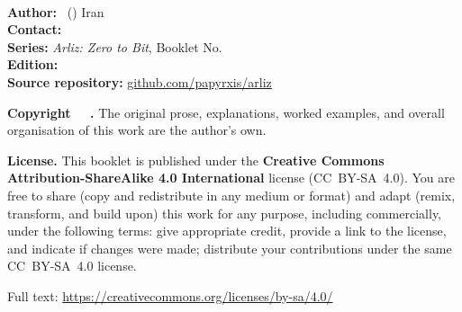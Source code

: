 \thispagestyle{empty}
\vspace*{0.8cm}
\begin{flushleft}
{\small\linespread{1.3}\selectfont

\textbf{\BookletTitle}\\[0.2em]
{\color{textsecondary}\BookletSubtitle}

\vspace{0.9em}

\textbf{Author:}   \BookletAuthor\ (\BookletAuthorHandle) \hfill Iran\\
\textbf{Contact:}  \href{mailto:\BookletEmail}{\BookletEmail}\\
\textbf{Series:}   \textit{Arliz: Zero to Bit},
                   Booklet No.\,\BookletNumber\\
\textbf{Edition:}  \BookletEdition\\
\textbf{Source repository:}
  \href{https://github.com/papyrxis/arliz}{github.com/papyrxis/arliz}

\vspace{0.9em}

\textbf{Copyright \textcopyright\ \BookletYear\ \BookletAuthor.}
The original prose, explanations, worked examples, and overall
organisation of this work are the author's own.

\vspace{0.7em}

\textbf{License.}
This booklet is published under the
\textbf{Creative Commons Attribution-ShareAlike 4.0 International}
license (CC~BY-SA~4.0). You are free to share (copy and redistribute
in any medium or format) and adapt (remix, transform, and build upon)
this work for any purpose, including commercially, under the following
terms: give appropriate credit, provide a link to the license, and
indicate if changes were made; distribute your contributions under the
same CC~BY-SA~4.0 license.

Full text: \url{https://creativecommons.org/licenses/by-sa/4.0/}

\vspace{0.7em}

}
\end{flushleft}
